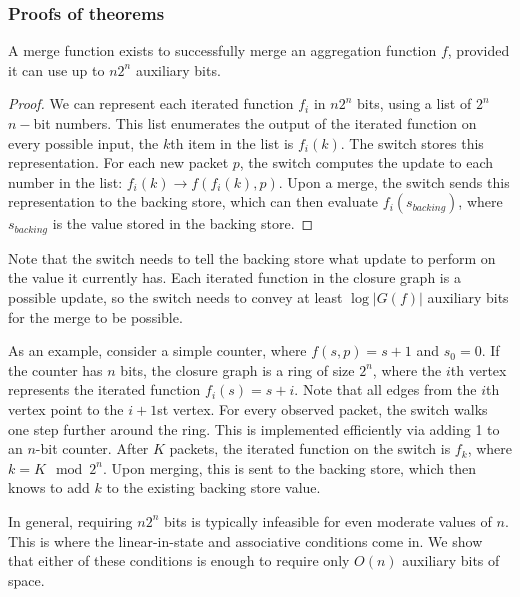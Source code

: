 \subsubsection{Proofs of theorems}
\label{ss:proofs}

\begin{theorem}
A merge function exists to successfully merge an aggregation function $f$,
provided it can use up to $n2^n$ auxiliary bits.
\end{theorem}
\begin{proof}
We can represent each iterated function $f_i$ in $n2^n$ bits, using a list of $2^n$ $n-$bit numbers. This list enumerates the output of the iterated function on every possible input, \ie the $k$th item in the list is $f_i(k)$. The switch stores this representation. For each new packet $p$, the switch computes the update to each number in the list: $f_i(k) \rightarrow f(f_i(k), p)$. Upon a merge, the switch sends this representation to the backing store, which can then evaluate $f_i(s_{backing})$, where $s_{backing}$ is the value stored in the backing store.
\end{proof}

Note that the switch needs to tell the backing store what update to perform on the value it currently has. Each iterated function in the closure graph is a possible update, so the switch needs to convey at least $\log |G(f)|$ auxiliary bits for the merge to be possible.

As an example, consider a simple counter, where $f(s, p) = s + 1$ and $s_0 = 0$. If the counter has $n$ bits, the closure graph is a ring of size $2^n$, where the $i$th vertex represents the iterated function $f_i(s) = s + i$. Note that all edges from the $i$th vertex point to the $i+1$st vertex. For every observed packet, the switch walks one step further around the ring. This is implemented efficiently via adding 1 to an $n$-bit counter. After $K$ packets, the iterated function on the switch is $f_{k}$, where $k = K \mod 2^n$. Upon merging, this is sent to the backing store, which then knows to add $k$ to the existing backing store value.

In general, requiring $n2^n$ bits is typically infeasible for even moderate values of $n$. This is where the linear-in-state and associative conditions come in. We show that either of these conditions is enough to require only $O(n)$ auxiliary bits of space.

